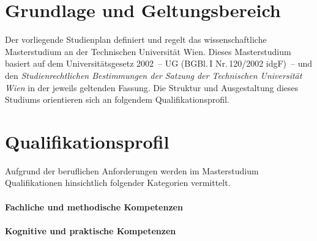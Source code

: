 
\newcommand*\Markierung{Master}
\newcommand*\Studienart{Masterstudium}
\newcommand*\ArtikelAkkusativStudienart{das}


\DECKBLATT

\tableofcontents
\clearpage

\section{Grundlage und Geltungsbereich}\label{sec:GG}

Der vorliegende Studienplan definiert und regelt das
{}wissenschaftliche
Masterstudium \emph{} an der Technischen Universität
Wien. Dieses Masterstudium basiert auf dem Universitätsgesetz 
2002~-- UG (BGBl.\,I Nr.\,120/2002 idgF)~-- und den 
\emph{Studienrechtlichen Bestimmungen der Satzung der Technischen 
Universität Wien} in der jeweils geltenden Fassung. 
Die Struktur und Ausgestaltung dieses Studiums orientieren
sich an folgendem Qualifikationsprofil.

\section{Qualifikationsprofil}\label{sec:QP}

\newcommand*\QPIntro{%
  Das Masterstudium \emph{\VAR{Titel}} vermittelt eine vertiefte,
  wissenschaftlich und methodisch hochwertige, auf dauerhaftes Wissen
  ausgerichtete Bildung, welche die Absolvent\_innen 
  sowohl für eine Weiterqualifizierung vor allem im Rahmen eines
  facheinschlägigen Doktoratsstudiums als auch für eine Beschäftigung
  in beispielsweise folgenden Tätigkeitsbereichen befähigt und
  international konkurrenzfähig macht.%
}


%

Aufgrund der beruflichen Anforderungen werden im Masterstudium
\emph{} Qualifikationen hinsichtlich folgender Kategorien
vermittelt.

\paragraph{Fachliche und methodische Kompetenzen}

\paragraph{Kognitive und praktische Kompetenzen}

